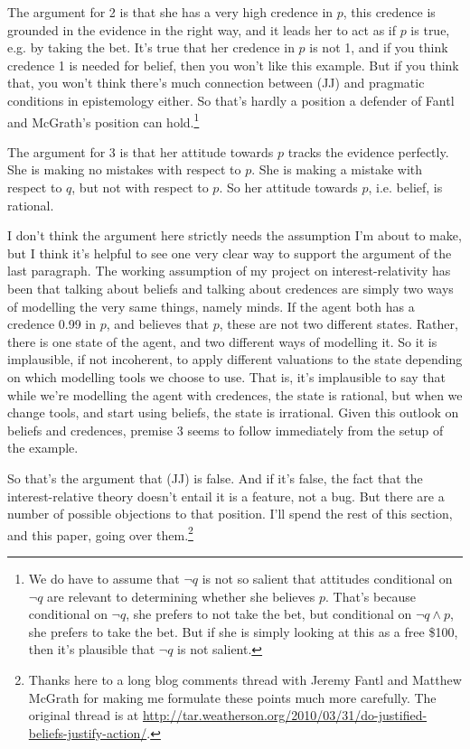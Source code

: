 The argument for 2 is that she has a very high credence in \(p\), this credence is grounded in the evidence in the right way, and it leads her to act as if \(p\) is true, e.g. by taking the bet. It's true that her credence in \(p\) is not 1, and if you think credence 1 is needed for belief, then you won't like this example. But if you think that, you won't think there's much connection between (JJ) and pragmatic conditions in epistemology either. So that's hardly a position a defender of Fantl and McGrath's position can hold.\footnote{We do have to assume that \(\neg q\) is not so salient that attitudes conditional on \(\neg q\) are relevant to determining whether she believes \(p\). That's because conditional on \(\neg q\), she prefers to not take the bet, but conditional on \(\neg q \wedge p\), she prefers to take the bet. But if she is simply looking at this as a free \$100, then it's plausible that \(\neg q\) is not salient.}

The argument for 3 is that her attitude towards \(p\) tracks the evidence perfectly. She is making no mistakes with respect to \(p\). She is making a mistake with respect to \(q\), but not with respect to \(p\). So her attitude towards \(p\), i.e. belief, is rational.

I don't think the argument here strictly needs the assumption I'm about to make, but I think it's helpful to see one very clear way to support the argument of the last paragraph. The working assumption of my project on interest-relativity has been that talking about beliefs and talking about credences are simply two ways of modelling the very same things, namely minds. If the agent both has a credence 0.99 in \(p\), and believes that \(p\), these are not two different states. Rather, there is one state of the agent, and two different ways of modelling it. So it is implausible, if not incoherent, to apply different valuations to the state depending on which modelling tools we choose to use. That is, it's implausible to say that while we're modelling the agent with credences, the state is rational, but when we change tools, and start using beliefs, the state is irrational. Given this outlook on beliefs and credences, premise 3 seems to follow immediately from the setup of the example.

So that's the argument that (JJ) is false. And if it's false, the fact that the interest-relative theory doesn't entail it is a feature, not a bug. But there are a number of possible objections to that position. I'll spend the rest of this section, and this paper, going over them.\footnote{Thanks here to a long blog comments thread with Jeremy Fantl and Matthew McGrath for making me formulate these points much more carefully. The original thread is at \url{http://tar.weatherson.org/2010/03/31/do-justified-beliefs-justify-action/}.}

